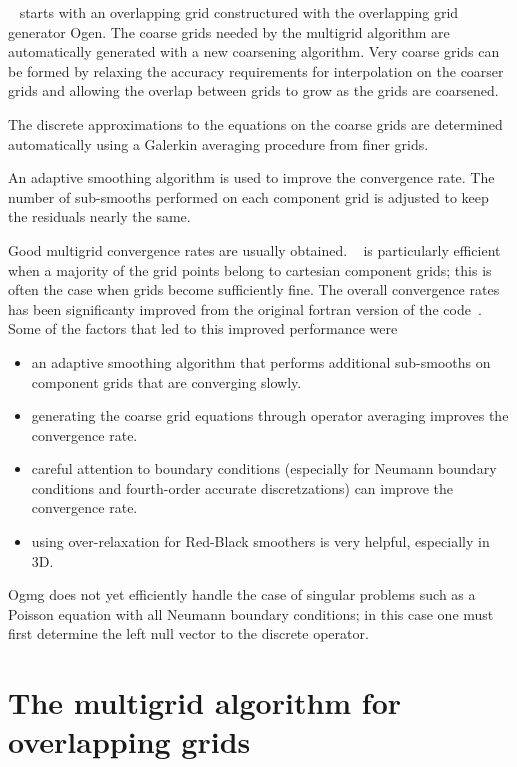 \documentclass{article}
\begin{document}
\Ogmg~ starts with an overlapping grid constructured with the overlapping grid generator Ogen.
The coarse grids needed by the multigrid algorithm 
are automatically generated with a new coarsening algorithm. Very coarse grids
can be formed by relaxing the accuracy requirements for interpolation on the coarser grids and
allowing the overlap between grids to grow as the grids are coarsened.

The discrete approximations to the equations on the coarse grids are determined automatically
using a Galerkin averaging procedure from finer grids.

An adaptive smoothing algorithm is used to improve the convergence rate. The number of sub-smooths
performed on each component grid is adjusted to keep the residuals nearly the same.

Good multigrid convergence rates are usually obtained. 
\Ogmg~  is particularly efficient when a majority of the grid points belong to cartesian component grids;
this is often the case when grids become sufficiently fine.
The overall convergence rates has been significanty improved from the original fortran version of
the code~\cite{CGMG}. Some of the factors that led to this improved performance were
\begin{itemize}
  \item an adaptive smoothing algorithm that performs additional sub-smooths on component grids that 
        are converging slowly.
  \item generating the coarse grid equations through operator averaging improves the convergence rate.
  \item careful attention to boundary conditions (especially for Neumann boundary conditions and
    fourth-order accurate discretzations) can improve the convergence rate.
  \item using over-relaxation for Red-Black smoothers is very helpful, especially in 3D.
\end{itemize}

Ogmg does not yet efficiently handle the case of singular problems such as a Poisson equation
with all Neumann boundary conditions; in this case one must first determine the left null vector
to the discrete operator. 


\section{The multigrid algorithm for overlapping grids}
\end{document}
